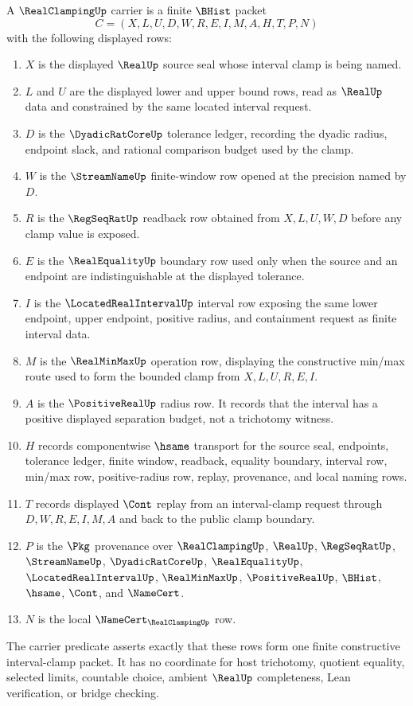 \begin{definition}
\label{def:real-clamping-carrier}
A $\RealClampingUp$ carrier is a finite $\BHist$ packet
$$
C=(X,L,U,D,W,R,E,I,M,A,H,T,P,N)
$$
with the following displayed rows:
\begin{enumerate}
\item $X$ is the displayed $\RealUp$ source seal whose interval clamp is being named.
\item $L$ and $U$ are the displayed lower and upper bound rows, read as $\RealUp$ data and constrained by the same located interval request.
\item $D$ is the $\DyadicRatCoreUp$ tolerance ledger, recording the dyadic radius, endpoint slack, and rational comparison budget used by the clamp.
\item $W$ is the $\StreamNameUp$ finite-window row opened at the precision named by $D$.
\item $R$ is the $\RegSeqRatUp$ readback row obtained from $X,L,U,W,D$ before any clamp value is exposed.
\item $E$ is the $\RealEqualityUp$ boundary row used only when the source and an endpoint are indistinguishable at the displayed tolerance.
\item $I$ is the $\LocatedRealIntervalUp$ interval row exposing the same lower endpoint, upper endpoint, positive radius, and containment request as finite interval data.
\item $M$ is the $\RealMinMaxUp$ operation row, displaying the constructive min/max route used to form the bounded clamp from $X,L,U,R,E,I$.
\item $A$ is the $\PositiveRealUp$ radius row. It records that the interval has a positive displayed separation budget, not a trichotomy witness.
\item $H$ records componentwise $\hsame$ transport for the source seal, endpoints, tolerance ledger, finite window, readback, equality boundary, interval row, min/max row, positive-radius row, replay, provenance, and local naming rows.
\item $T$ records displayed $\Cont$ replay from an interval-clamp request through $D,W,R,E,I,M,A$ and back to the public clamp boundary.
\item $P$ is the $\Pkg$ provenance over $\RealClampingUp$, $\RealUp$, $\RegSeqRatUp$, $\StreamNameUp$, $\DyadicRatCoreUp$, $\RealEqualityUp$, $\LocatedRealIntervalUp$, $\RealMinMaxUp$, $\PositiveRealUp$, $\BHist$, $\hsame$, $\Cont$, and $\NameCert$.
\item $N$ is the local $\NameCert_{\RealClampingUp}$ row.
\end{enumerate}
The carrier predicate asserts exactly that these rows form one finite constructive interval-clamp packet. It has no coordinate for host trichotomy, quotient equality, selected limits, countable choice, ambient $\RealUp$ completeness, Lean verification, or bridge checking.
\end{definition}

